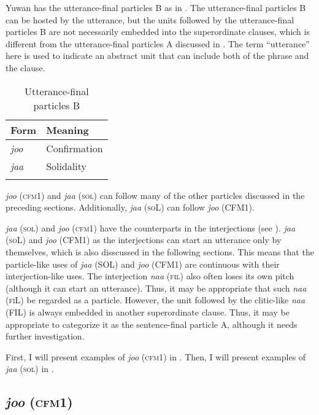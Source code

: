 Yuwan has the utterance-final particles B as in . The utterance-final particles B can be hosted by the utterance, but the units followed by the utterance-final particles B are not necessarily embedded into the superordinate clauses, which is different from the utterance-final particles A discussed in . The term “utterance” here is used to indicate an abstract unit that can include both of the phrase and the clause.

\begin{table}
\caption{Utterance-final particles B\label{tab:101}}
\begin{tabular}{ll}
\lsptoprule
Form & Meaning\\\midrule
\textit{joo} &  Confirmation\\
\textit{jaa} &  Solidality\\\lspbottomrule
\end{tabular}
\end{table}

\textit{joo} (\textsc{cfm}1) and \textit{jaa} (\textsc{sol}) can follow many of the other particles discussed in the preceding sections. Additionally, \textit{jaa} (\textsc{so}L) can follow \textit{joo} (CFM1).

\textit{jaa}  (\textsc{sol}) and \textit{joo} (\textsc{cfm}1) have the counterparts in the interjections (see ). \textit{jaa} (\textsc{so}L) and \textit{joo} (CFM1) as the interjections can start an utterance only by themselves, which is also disscussed in the following sections. This means that the particle-like uses of \textit{jaa} (SOL) and \textit{joo} (CFM1) are continuous with their interjection-like uses. The interjection \textit{naa} (\textsc{fil}) also often loses its own pitch (although it can start an utterance). Thus, it may be appropriate that such \textit{naa} (\textsc{fi}L) be regarded as a particle. However, the unit followed by the clitic-like \textit{naa} (FIL) is always embedded in another superordinate clause. Thus, it may be appropriate to categorize it as the sentence-final particle A, although it needs further investigation.

First, I will present examples of \textit{joo} (\textsc{cfm}1) in . Then, I will present examples of \textit{jaa} (\textsc{sol}) in .

\subsection{\textit{joo} (\textsc{cfm}1)}\label{sec:10.5.1}

